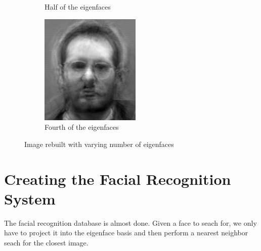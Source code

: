 \begin{figure}
\begin{subfigure}[b]{0.3\textwidth}
\caption{Half of the eigenfaces}
\end{subfigure}
\begin{subfigure}[b]{0.3\textwidth}
\includegraphics[width=\textwidth]{rebuiltFourth.png}
\caption{Fourth of the eigenfaces}
\end{subfigure}
\caption{Image rebuilt with varying number of eigenfaces}
\label{facialRecognition:rebuiltImage}
\end{figure}

\section*{Creating the Facial Recognition System}

The facial recognition database is almost done. 
Given a face to seach for, we only have to project it into the eigenface basis and then perform a nearest neighbor seach for the closest image.

